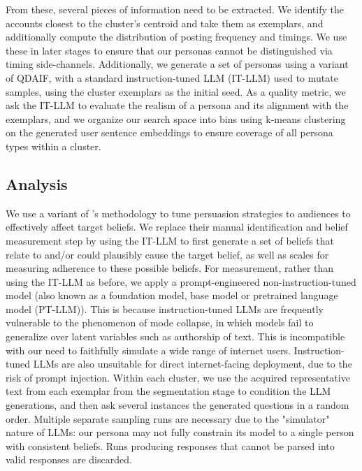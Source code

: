 \documentclass[11pt]{article}
\begin{document}
From these, several pieces of information need to be extracted. We identify the accounts closest to the cluster's centroid and take them as exemplars, and additionally compute the distribution of posting frequency and timings. We use these in later stages to ensure that our personas cannot be distinguished via timing side-channels. Additionally, we generate a set of personas using a variant of QDAIF\cite{bradley2023qualitydiversity}, with a standard instruction-tuned LLM (IT-LLM) used to mutate samples, using the cluster exemplars as the initial seed. As a quality metric, we ask the IT-LLM to evaluate the realism of a persona and its alignment with the exemplars, and we organize our search space into bins using k-means clustering on the generated user sentence embeddings to ensure coverage of all persona types within a cluster.

\subsection{Analysis}

We use a variant of \cite{powell2018}'s methodology to tune persuasion strategies to audiences to effectively affect target beliefs. We replace their manual identification and belief measurement step by using the IT-LLM to first generate a set of beliefs that relate to and/or could plausibly cause the target belief, as well as scales for measuring adherence to these possible beliefs. For measurement, rather than using the IT-LLM as before, we apply a prompt-engineered non-instruction-tuned model (also known as a foundation model, base model or pretrained language model (PT-LLM)). This is because instruction-tuned LLMs are frequently vulnerable to the phenomenon of mode collapse\cite{mysteriesofmodecollapse}\cite{hamilton2024detecting}, in which models fail to generalize over latent variables such as authorship of text. This is incompatible with our need to faithfully simulate a wide range of internet users. Instruction-tuned LLMs are also unsuitable for direct internet-facing deployment, due to the risk of prompt injection\cite{perez2022ignore}. Within each cluster, we use the acquired representative text from each exemplar from the segmentation stage to condition the LLM generations, and then ask several instances the generated questions in a random order. Multiple separate sampling runs are necessary due to the "simulator" nature of LLMs\cite{Shanahan2023}: our persona may not fully constrain its model to a single person with consistent beliefs. Runs producing responses that cannot be parsed into valid responses are discarded.
\end{document}
